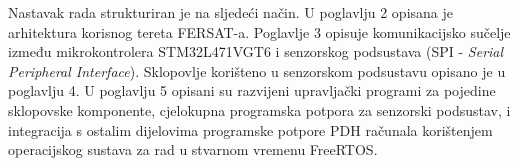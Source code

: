     
    Nastavak rada strukturiran je na sljedeći način. U poglavlju 2 opisana je arhitektura korisnog tereta FERSAT-a. Poglavlje 3 opisuje komunikacijsko sučelje između mikrokontrolera STM32L471VGT6 i senzorskog podsustava (SPI - \textit{Serial Peripheral Interface}). Sklopovlje korišteno u senzorskom podsustavu opisano je u poglavlju 4. U poglavlju 5 opisani su razvijeni upravljački programi za pojedine sklopovske komponente, cjelokupna programska potpora za senzorski podsustav, i integracija s ostalim dijelovima programske potpore PDH računala korištenjem operacijskog sustava za rad u stvarnom vremenu FreeRTOS.
